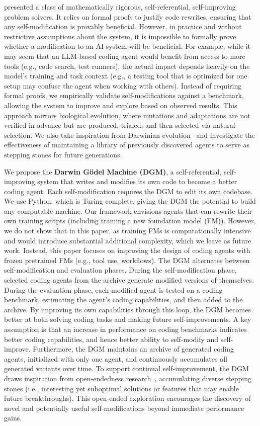 \documentclass{article} %
\begin{document}
\citet{schmidhuber2007godel} presented a class of mathematically rigorous, self-referential, self-improving problem solvers. It relies on formal proofs to justify code rewrites, ensuring that any self-modification is provably beneficial. However, in practice and without restrictive assumptions about the system, it is impossible to formally prove whether a modification to an AI system will be beneficial. For example, while it may seem that an LLM-based coding agent would benefit from access to more tools (e.g., code search, test runners), the actual impact depends heavily on the model’s training and task context (e.g., a testing tool that is optimized for one setup may confuse the agent when working with others). Instead of requiring formal proofs, we empirically validate self-modifications against a benchmark, allowing the system to improve and explore based on observed results. This approach mirrors biological evolution, where mutations and adaptations are not verified in advance but are produced, trialed, and then selected via natural selection. We also take inspiration from Darwinian evolution~\citep{darwin2023origin} and investigate the effectiveness of maintaining a library of previously discovered agents to serve as stepping stones for future generations.

We propose the \textbf{Darwin G\"odel Machine (DGM)}, a self-referential, self-improving system that writes and modifies its own code to become a better coding agent. Each self-modification requires the DGM to edit its own codebase. We use Python, which is Turing-complete, giving the DGM the potential to build any computable machine. Our framework envisions agents that can rewrite their own training scripts (including training a new foundation model (FM)). However, we do not show that in this paper, as training FMs is computationally intensive and would introduce substantial additional complexity, which we leave as future work. Instead, this paper focuses on improving the design of coding agents with frozen pretrained FMs (e.g., tool use, workflows). The DGM alternates between self-modification and evaluation phases. During the self-modification phase, selected coding agents from the archive generate modified versions of themselves. During the evaluation phase, each modified agent is tested on a coding benchmark, estimating the agent's coding capabilities, and then added to the archive. By improving its own capabilities through this loop, the DGM becomes better at both solving coding tasks and making future self-improvements. A key assumption is that an increase in performance on coding benchmarks indicates better coding capabilities, and hence better ability to self-modify and self-improve. Furthermore, the DGM maintains an archive of generated coding agents, initialized with only one agent, and continuously accumulates all generated variants over time. To support continual self-improvement, the DGM draws inspiration from open-endedness research~\citep{wang2019paired, fernandopromptbreeder, faldor2025omni}, accumulating diverse stepping stones (i.e., interesting yet suboptimal solutions or features that may enable future breakthroughs). This open-ended exploration encourages the discovery of novel and potentially useful self-modifications beyond immediate performance gains.
\end{document}
